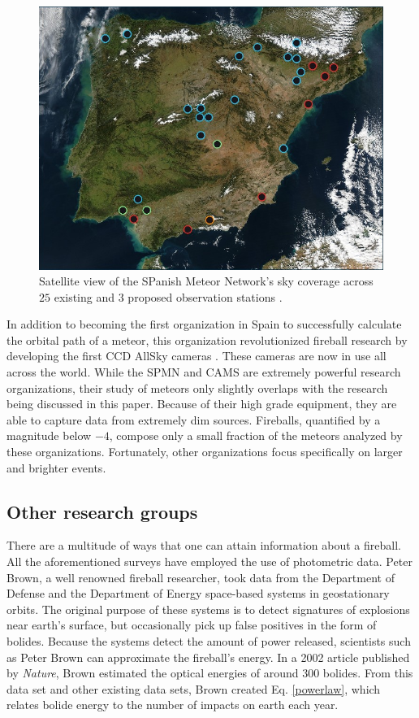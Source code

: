 \begin{figure}[ht!]
  \centering
  \includegraphics[scale=0.3]{images/satalite_of_love.png}
  \caption{Satellite view of the SPanish Meteor Network's sky coverage across $25$ existing and $3$ proposed observation stations  \cite{noauthor_presentation_nodate}.}
  \label{SPan}
\end{figure}

In addition to becoming the first organization in Spain to successfully calculate the orbital path of a meteor, this organization revolutionized fireball research by developing the first CCD AllSky cameras \cite{noauthor_presentation_nodate}.
These cameras are now in use all across the world.
While the SPMN and CAMS are extremely powerful research organizations, their study of meteors only slightly overlaps with the research being discussed in this paper.
Because of their high grade equipment, they are able to capture data from extremely dim sources.
Fireballs, quantified by a magnitude below $-4$, compose only a small fraction of the meteors analyzed by these organizations.
Fortunately, other organizations focus specifically on larger and brighter events.

\subsection{Other research groups}

There are a multitude of ways that one can attain information about a fireball.  
All the aforementioned surveys have employed the use of photometric data.
Peter Brown, a well renowned fireball researcher, took data from the Department of Defense and the Department of Energy space-based systems in geostationary orbits.
The original purpose of these systems is to detect signatures of explosions near earth's surface, but occasionally pick up false positives in the form of bolides.  
Because the systems detect the amount of power released, scientists such as Peter Brown can approximate the fireball's energy.
In a 2002 article published by \textit{Nature}, Brown estimated the optical energies of around 300 bolides.
From this data set and other existing data sets, Brown created Eq. \ref{powerlaw}, which relates bolide energy to the number of impacts on earth each year. 

